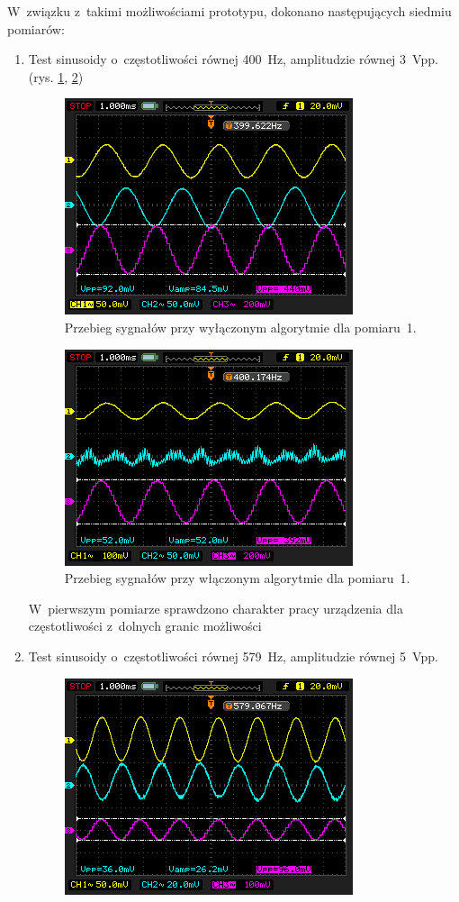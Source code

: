 W~związku z~takimi możliwościami prototypu, dokonano następujących siedmiu pomiarów:
\begin{enumerate}
	\item Test sinusoidy o~częstotliwości równej \SI{400}{\Hz}, amplitudzie równej 3~Vpp. (rys. \ref{fig:test_1_off}, \ref{fig:test_1_on})\\
	\begin{figure}[h!]
		\centering
		\includegraphics[scale=0.7]{../Assets/Results/1_400_3_off.png}
		\caption{Przebieg sygnałów przy wyłączonym algorytmie dla pomiaru~1.}
		\label{fig:test_1_off}
	\end{figure}
	\begin{figure}[h!]
		\centering
		\includegraphics[scale=0.7]{../Assets/Results/1_400_3_on.png}
		\caption{Przebieg sygnałów przy włączonym algorytmie dla pomiaru~1.}
		\label{fig:test_1_on}
	\end{figure}
	W~pierwszym pomiarze sprawdzono charakter pracy urządzenia dla częstotliwości z~dolnych granic możliwości 
	\item Test sinusoidy o~częstotliwości równej \SI{579}{\Hz}, amplitudzie równej 5~Vpp.\\
	\begin{figure}[h!]
		\centering
		\includegraphics[scale=0.7]{../Assets/Results/2_579_5_off.png}

\end{figure}
\end{enumerate}
